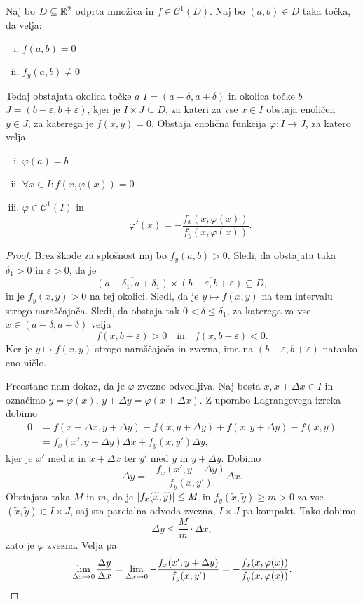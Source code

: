 \begin{izrek}
Naj bo $D \subseteq \mathbb{R}^2$ odprta množica in
$f \in \mathcal{C}^1(D)$. Naj bo $(a,b) \in D$ taka točka, da
velja:

\begin{enumerate}[i)]
\item $f(a,b) = 0$
\item $f_y(a,b) \ne 0$
\end{enumerate}

Tedaj obstajata okolica točke $a$ $I=(a-\delta, a+\delta)$ in
okolica točke $b$ $J=(b-\varepsilon, b+\varepsilon)$, kjer je
$I \times J \subseteq D$, za kateri za vse $x \in I$ obstaja
enoličen $y\in J$, za katerega je $f(x,y) = 0$. Obstaja enolična
funkcija $\varphi \colon I \to J$, za katero velja

\begin{enumerate}[i)]
\item $\varphi(a) = b$
\item $\forall x \in I \colon f(x,\varphi(x)) = 0$
\item $\varphi \in \mathcal{C}^1(I)$ in
\[
\varphi'(x) = - \frac{f_x(x,\varphi(x))}{f_y(x,\varphi(x))}.
\]
\end{enumerate}
\end{izrek}

\begin{proof}
Brez škode za splošnost naj bo $f_y(a,b) > 0$. Sledi, da obstajata
taka $\delta_1 > 0$ in $\varepsilon > 0$, da je
\[
\overline{(a-\delta_1,a+\delta_1)} \times
\overline{(b-\varepsilon,b+\varepsilon)} \subseteq D,
\]
in je $f_y(x,y) > 0$ na tej okolici. Sledi, da je
$y \mapsto f(x,y)$ na tem intervalu strogo naraščajoča. Sledi, da
obstaja tak $0 < \delta \leq \delta_1$, za katerega za vse
$x \in (a-\delta, a+\delta)$ velja
\[
f(x, b+\varepsilon) > 0
\quad \text{in} \quad
f(x, b-\varepsilon) < 0.
\]
Ker je $y \mapsto f(x,y)$ strogo naraščajoča in zvezna, ima na
$(b-\varepsilon,b+\varepsilon)$ natanko eno ničlo.

Preostane nam dokaz, da je $\varphi$ zvezno odvedljiva. Naj bosta
$x, x+\Delta x \in I$ in označimo
$y = \varphi(x)$, $y + \Delta y = \varphi(x + \Delta x)$. Z uporabo
Lagrangevega izreka dobimo
\begin{align*}
0 &=
f(x + \Delta x, y + \Delta y) - f(x, y + \Delta y) +
f(x, y + \Delta y) - f(x, y)
\\
&= f_x(x', y + \Delta y) \Delta x + f_y(x, y') \Delta y,
\end{align*}
kjer je $x'$ med $x$ in $x + \Delta x$ ter $y'$ med $y$ in
$y + \Delta y$. Dobimo
\[
\Delta y = - \frac{f_x(x', y + \Delta y)}{f_y(x, y')} \Delta x.
\]
Obstajata taka $M$ in $m$, da je
$\left\lvert f_x(\widetilde{x},\widetilde{y})\right\rvert \leq M$ in
$f_y(\widetilde{x},\widetilde{y}) \geq m > 0$ za vse
$(\widetilde{x},\widetilde{y}) \in I \times J$, saj sta parcialna
odvoda zvezna, $I \times J$ pa kompakt. Tako dobimo
\[
\Delta y \leq \frac{M}{m} \cdot \Delta x,
\]
zato je $\varphi$ zvezna. Velja pa
\[
\lim_{\Delta x \to 0}\frac{\Delta y}{\Delta x} =
\lim_{\Delta x \to 0} - \frac{f_x(x', y + \Delta y)}{f_y(x, y')} =
- \frac{f_x(x,\varphi(x))}{f_y(x,\varphi(x))}. \qedhere
\]
\end{proof}

